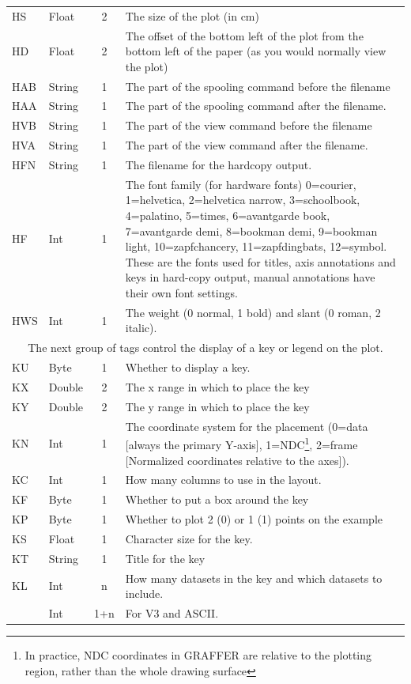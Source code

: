 \documentclass[english]{article}
\begin{document}
\begin{longtable}{|llcp{9cm}|}
  HS& Float& 2&
  The size of the plot (in cm)\\
  HD& Float& 2& The offset of the bottom left of the plot from the
  bottom left of the
  paper (as you would normally view the plot)\\
  HAB& String& 1&
  The part of the spooling command before the filename\\
  HAA& String& 1&
  The part of the spooling command after the filename.\\
  HVB& String& 1&
  The part of the view command before the filename\\
  HVA& String& 1&
  The part of the view command after the filename.\\
  HFN& String & 1 & The filename for the hardcopy output.\\
  HF& Int& 1& The font family (for hardware fonts) 0=courier,
  1=helvetica, 2=helvetica narrow, 3=schoolbook, 4=palatino, 5=times,
  6=avantgarde book, 7=avantgarde demi, 8=bookman demi, 9=bookman
  light, 10=zapfchancery, 11=zapfdingbats, 12=symbol. These are the
  fonts used for titles, axis annotations and keys
  in hard-copy output, manual annotations have their own font settings.\\
  HWS& Int& 1&
  The weight (0 normal, 1 bold) and slant (0 roman, 2 italic).\\
  \hline \multicolumn{4}{|c|}{The next group of tags control the
    display of a key or legend on the
    plot.}\\
  \hline KU& Byte& 1&
  Whether to display a key.\\
  KX& Double& 2&
  The x range in which to place the key\\
  KY& Double& 2&
  The y range in which to place the key\\
  KN& Int& 1& The coordinate system for the placement (0=data [always
  the primary Y-axis], 1=NDC\footnote{In practice, NDC coordinates in
    GRAFFER are relative to the plotting region, rather than the whole
    drawing surface}, 2=frame [Normalized
  coordinates relative to the axes]).\\
  KC& Int& 1&
  How many columns to use in the layout.\\
  KF& Byte& 1&
  Whether to put a box around the key\\
  KP& Byte& 1&
  Whether to plot 2 (0) or 1 (1) points on the example\\
  KS & Float & 1 & Character size for the key.\\
  KT& String& 1&
  Title for the key\\
  KL& Int& n&
  How many datasets in the key and which datasets to include.\\
  & Int& 1+n&
  For V3 and ASCII.\\
\end{longtable}
\end{document}
